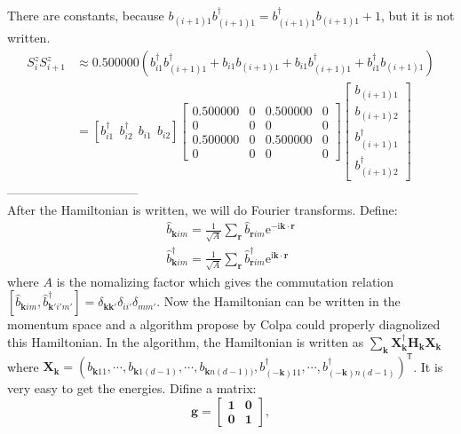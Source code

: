 \documentclass[letter]{article}
\newcommand{\e}{\mathrm{e}}
\newcommand{\ii}{\mathrm{i}}
\begin{document}
There are constants, because $b_{(i+1)1}b_{(i+1)1}^{\dagger}=b_{(i+1)1}^{\dagger}b_{(i+1)1}+1$, but it is not written.
$$
\begin{aligned}
    S_{i}^z S_{i+1}^z &\approx0.500000\left(b_{i1}^{\dagger}b_{(i+1)1}^{\dagger}+b_{i1}b_{(i+1)1}+b_{i1}b_{(i+1)1}^{\dagger}+b_{i1}^{\dagger}b_{(i+1)1}\right)\\ &=\left[
        b_{i1}^{\dagger} \ \ 
        b_{i2}^{\dagger}\  \ 
        b_{i1}\ \ 
        b_{i2}\right]
       \begin{bmatrix}
            0.500000 & 0 & 0.500000 & 0 \\
           0 &  0 & 0 &0 \\
            0.500000 &  0 & 0.500000 &0\\
            0 & 0 & 0& 0
            \end{bmatrix}\begin{bmatrix}
                b_{(i+1)1}  \\
                b_{(i+1)2}  \\
                b_{(i+1)1}^{\dagger}\\
                b_{(i+1)2}^{\dagger}
                \end{bmatrix}
\end{aligned}
$$
--------------------------------\\
After the Hamiltonian is written, we will do Fourier transforms. Define:
$$ \begin{aligned}
    \hat{b}_{\bm{k}im}=\frac{1}{\sqrt{A}}\sum_{\bm{r}}\hat{b}_{\bm{r}im}\e^{-\ii\bm{k}\cdot\bm{r}} \\
    \hat{b}_{\bm{k}im}^{\dagger}=\frac{1}{\sqrt{A}}\sum_{\bm{r}}\hat{b}_{\bm{r}im}^{\dagger}\e^{\ii\bm{k}\cdot\bm{r}}
    \end{aligned} $$
where $A$ is the nomalizing factor which gives the commutation relation $\left[\hat{b}_{\bm{k}im},\hat{b}_{\bm{k'}i'm'}^{\dagger}\right]=\delta_{\bm{k}\bm{k}'}\delta_{ii'}\delta_{mm'}$. Now the Hamiltonian can be written in the momentum space and a algorithm propose by Colpa could properly diagnolized this Hamiltonian. In the algorithm, the Hamiltonian is written as $\sum_{\bm{k}}\mathbf{X}^{\dagger}_{\bm{k}}\mathbf{H}_{\bm{k}}\mathbf{X}_{\bm{k}}$ where $\mathbf{X}_{\bm{k}}=\left(b_{\bm{k}11},\cdots,b_{\bm{k}1(d-1)},\cdots,b_{\bm{k}n(d-1))},b_{(-\bm{k})11}^{\dagger},\cdots,b_{(-\bm{k})n(d-1)}^{\dagger}\right)^{\mathsf{T}}$. It is very easy to get the energies. Difine a matrix:$$
\mathbf{g}=\begin{bmatrix}
    \mathbf{1} & \mathbf{0}  \\
    \mathbf{0} &  \mathbf{1}
    \end{bmatrix},
$$
\end{document}
